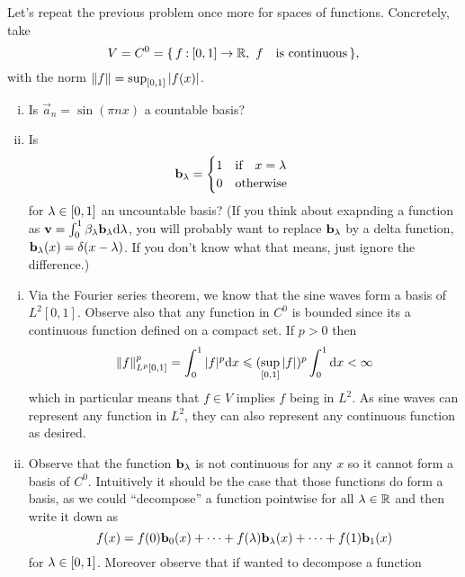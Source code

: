 \documentclass[12pt]{memoir}
\begin{document}
\begin{Ej}
    Let's repeat the previous problem once more for spaces of
functions. Concretely, take
$$V=C^0=\{\,f\mathbin{:}[0,1]\to \mathbb{R},\ f\quad\text{is continuous}\,\},$$
with the norm $\norm{f}=\sup_{\left\lbrack0,1\right\rbrack}|f(x)|$.
\begin{enumerate}[i)]
    \item Is $\vec a_n=\sin(\pi n x)$ a countable basis?
    \item Is 
    $$\mathbf{b}_\lambda=\begin{cases}
        1\quad\text{if}\quad x=\lambda\\
        0\quad\text{otherwise}\quad
    \end{cases}$$
    for $\lambda\in\left\lbrack0,1\right\rbrack$ an uncountable basis? (If you think about exapnding a function as $\mathbf{v}=\int_0^1\beta_\lambda\mathbf{b}_\lambda\dd\lambda$, you will probably want to replace $\mathbf{b}_\lambda$ by a delta function, $\mathbf{b}_\lambda(x)=\delta(x-\lambda)$. If you don't know what that means, just ignore the difference.)
\end{enumerate}
\end{Ej}

\begin{ptcbr}
    \begin{enumerate}[i)]
        \item Via the Fourier series theorem, we know that the sine waves form a basis of $L^2[0,1]$. Observe also that any function in $C^0$ is bounded since its a continuous function defined on a compact set. If $p>0$ then 
        $$\norm{f}_{L^p[0,1]}^p=\int_0^1|f|^p\dd x\leqslant(\sup_{[0,1]}|f|)^p\int_0^1\dd x<\infty$$
        which in particular means that $f\in V$ implies $f$ being in $L^2$. As sine waves can represent any function in $L^2$, they can also represent any continuous function as desired.  
        \item Observe that the function $\mathbf{b}_\lambda$ is not continuous for any $x$ so it cannot form a basis of $C^0$. Intuitively it should be the case that those functions do form a basis, as we could ``decompose'' a function pointwise for all $\lambda\in\mathbb{R}$ and then write it down as 
        $$f(x)=f(0)\mathbf{b}_0(x)+\dots+f(\lambda)\mathbf{b}_\lambda(x)+\dots+f(1)\mathbf{b}_1(x)$$
        for $\lambda\in\left\lbrack0,1\right\rbrack$. Moreover observe that if wanted to decompose a function 
    \end{enumerate}
\end{ptcbr}
\end{document}
